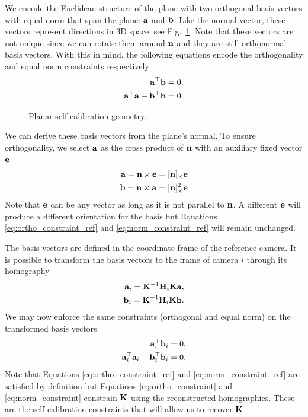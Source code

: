 \documentclass[10pt,twocolumn,letterpaper]{article}
\begin{document}
We encode the Euclidean structure of the plane with two orthogonal basis vectors with equal norm that span the plane: $\mathbf{a}$ and $\mathbf{b}$. Like the normal vector, these vectors represent directions in 3D space, see Fig.~\ref{fig:planar_structure}. Note that these vectors are not unique since we can rotate them around $\mathbf{n}$ and they are still orthonormal basis vectors. With this in mind, the following equations encode the orthogonality and equal norm constraints respectively
\begin{align}
\mathbf{a}^\top \mathbf{b} = 0, \label{eq:ortho_constraint_ref} \\
\mathbf{a}^\top \mathbf{a} - \mathbf{b}^\top \mathbf{b} = 0. \label{eq:norm_constraint_ref}
\end{align}

\begin{figure}

\caption{Planar self-calibration geometry.}
\label{fig:planar_structure}
\end{figure}

We can derive these basis vectors from the plane's normal. To ensure orthogonality, we select $\mathbf{a}$ as the cross product of $\mathbf{n}$ with an auxiliary fixed vector $\mathbf{e}$
\begin{align}
\mathbf{a} = \mathbf{n} \times \mathbf{e} = [\mathbf{n}]_\times \mathbf{e} \\
\mathbf{b} = \mathbf{n} \times \mathbf{a} = [\mathbf{n}]_\times^2 \mathbf{e}
\end{align}
Note that $\mathbf{e}$ can be any vector as long as it is not parallel to $\mathbf{n}$. A different $\mathbf{e}$ will produce a different orientation for the basis but Equations \eqref{eq:ortho_constraint_ref} and \eqref{eq:norm_constraint_ref} will remain unchanged.

The basis vectors are defined in the coordinate frame of the reference camera. It is possible to transform the basis vectors to the frame of camera $i$ through its homography
\begin{align}
\mathbf{a}_i = \mathbf{K}^{-1} \mathbf{H}_i \mathbf{K} \mathbf{a}, \\
\mathbf{b}_i = \mathbf{K}^{-1} \mathbf{H}_i \mathbf{K} \mathbf{b}.
\end{align}
%
We may now enforce the same constraints (orthogonal and equal norm) on the transformed basis vectors
\begin{align}
\mathbf{a}_i^\top \mathbf{b}_i = 0, \label{eq:ortho_constraint} \\
\mathbf{a}_i^\top \mathbf{a}_i - \mathbf{b}_i^\top \mathbf{b}_i = 0. \label{eq:norm_constraint} 
\end{align}
%
Note that Equations \eqref{eq:ortho_constraint_ref} and \eqref{eq:norm_constraint_ref} are satisfied by definition but Equations \eqref{eq:ortho_constraint} and \eqref{eq:norm_constraint} constrain $\mathbf{K}$ using the reconstructed homographies. These are the self-calibration constraints that will allow us to recover $\mathbf{K}$.
\end{document}
